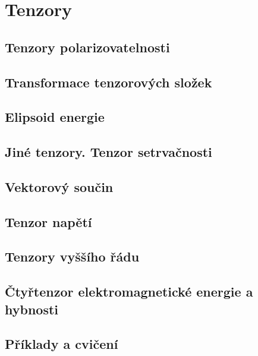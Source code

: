 \chapter{Tenzory}\label{fyz:IIchapXXXI}
\minitoc
  \section{Tenzory polarizovatelnosti}\label{fyz:IIchapXXXIsecI}
  \section{Transformace tenzorových složek}\label{fyz:IIchapXXXIsecII}
  \section{Elipsoid energie}\label{fyz:IIchapXXXIsecIII}
  \section{Jiné tenzory. Tenzor setrvačnosti}\label{fyz:IIchapXXXIsecIV}
  \section{Vektorový součin}\label{fyz:IIchapXXXIsecV}
  \section{Tenzor napětí}\label{fyz:IIchapXXXIsecVI}
  \section{Tenzory vyššího řádu}\label{fyz:IIchapXXXIsecVII}
  \section{Čtyřtenzor elektromagnetické energie a hybnosti}\label{fyz:IIchapXXXIsecVIII}
  \section{Příklady a cvičení}\label{fyz:IIchapXXXIsecIX}

